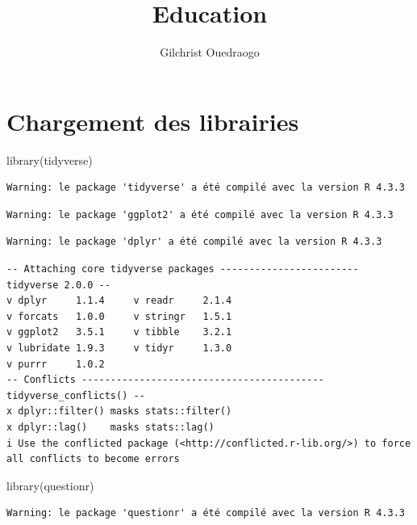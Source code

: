 \documentclass[
  letterpaper,
  DIV=11,
  numbers=noendperiod]{scrartcl}
\title{Education}
\author{Gilchrist Ouedraogo}
\date{}
\newenvironment{Shaded}{\begin{snugshade}}{\end{snugshade}}
\newcommand{\FunctionTok}[1]{\textcolor[rgb]{0.28,0.35,0.67}{#1}}
\newcommand{\NormalTok}[1]{\textcolor[rgb]{0.00,0.23,0.31}{#1}}
\begin{document}
\maketitle


\section{Chargement des librairies}\label{chargement-des-librairies}

\begin{Shaded}
\begin{Highlighting}[]
\FunctionTok{library}\NormalTok{(tidyverse)}
\end{Highlighting}
\end{Shaded}

\begin{verbatim}
Warning: le package 'tidyverse' a été compilé avec la version R 4.3.3
\end{verbatim}

\begin{verbatim}
Warning: le package 'ggplot2' a été compilé avec la version R 4.3.3
\end{verbatim}

\begin{verbatim}
Warning: le package 'dplyr' a été compilé avec la version R 4.3.3
\end{verbatim}

\begin{verbatim}
-- Attaching core tidyverse packages ------------------------ tidyverse 2.0.0 --
v dplyr     1.1.4     v readr     2.1.4
v forcats   1.0.0     v stringr   1.5.1
v ggplot2   3.5.1     v tibble    3.2.1
v lubridate 1.9.3     v tidyr     1.3.0
v purrr     1.0.2     
-- Conflicts ------------------------------------------ tidyverse_conflicts() --
x dplyr::filter() masks stats::filter()
x dplyr::lag()    masks stats::lag()
i Use the conflicted package (<http://conflicted.r-lib.org/>) to force all conflicts to become errors
\end{verbatim}

\begin{Shaded}
\begin{Highlighting}[]
\FunctionTok{library}\NormalTok{(questionr)}
\end{Highlighting}
\end{Shaded}

\begin{verbatim}
Warning: le package 'questionr' a été compilé avec la version R 4.3.3
\end{verbatim}
\end{document}
